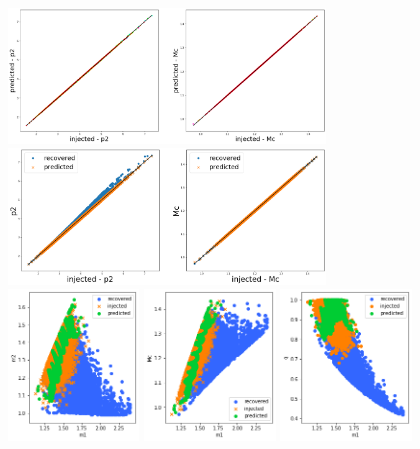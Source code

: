 \documentclass[prd,aps,twocolumn,a4paper,showkeys,nofootinbib]{revtex4-1}
\begin{document}
%
\begin{figure}[t]
  \center
  \includegraphics[width=0.75\textwidth]{./Figs/GstLAL_p2_regression.png}
  \includegraphics[width=0.75\textwidth]{./Figs/GstLAL_p2_regression_noise.png}
  \includegraphics[width=0.31\textwidth]{./Figs/GstLAL_p2_m2.png}
  \includegraphics[width=0.31\textwidth]{./Figs/GstLAL_p2_Mc.png}
  \includegraphics[width=0.31\textwidth]{./Figs/GstLAL_p2_q.png}

\end{figure}
\end{document}
